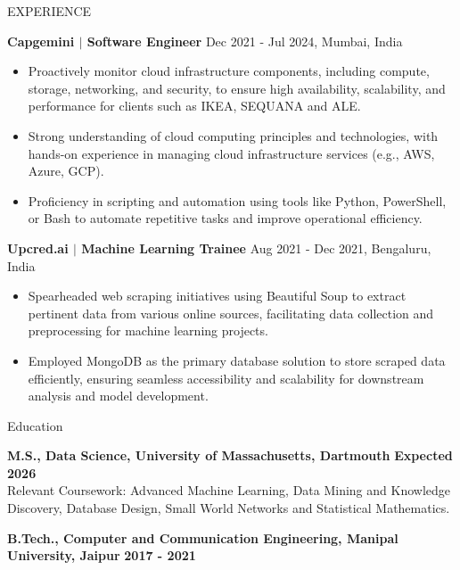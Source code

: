 \documentclass{resume} %
\begin{document}
\begin{rSection}{EXPERIENCE}

\textbf{Capgemini $\vert$ Software Engineer} \hfill Dec 2021 - Jul 2024, Mumbai, India\\
\vspace{-\baselineskip} 
 \begin{itemize}
    \itemsep -3pt {} 
     \item Proactively monitor cloud infrastructure components, including compute, storage, networking, and security, to ensure high availability, scalability, and performance for clients such as IKEA, SEQUANA and ALE.
    \item Strong understanding of cloud computing principles and technologies, with hands-on experience in managing cloud infrastructure services (e.g., AWS, Azure, GCP).
    \item Proficiency in scripting and automation using tools like Python, PowerShell, or Bash to automate repetitive tasks and improve operational efficiency.
 \end{itemize}
 
\textbf{Upcred.ai $\vert$ Machine Learning Trainee} \hfill Aug 2021 - Dec 2021, Bengaluru, India\\
\vspace{-\baselineskip} 
 \begin{itemize}
    \itemsep -3pt {} 
     \item Spearheaded web scraping initiatives using Beautiful Soup to extract pertinent data from various online sources, facilitating data collection and preprocessing for machine learning projects.
     \item Employed MongoDB as the primary database solution to store scraped data efficiently, ensuring seamless accessibility and scalability for downstream analysis and model development.
 \end{itemize}

\end{rSection} 

\begin{rSection}{Education}

{\bf M.S., Data Science, University of Massachusetts, Dartmouth} \hfill \textbf{Expected 2026}\\
Relevant Coursework: Advanced Machine Learning, Data Mining and Knowledge Discovery, Database Design, Small World Networks and Statistical Mathematics.

{\bf B.Tech., Computer and Communication Engineering, Manipal University, Jaipur} \hfill \textbf{2017 - 2021}

\end{rSection}
\end{document}
